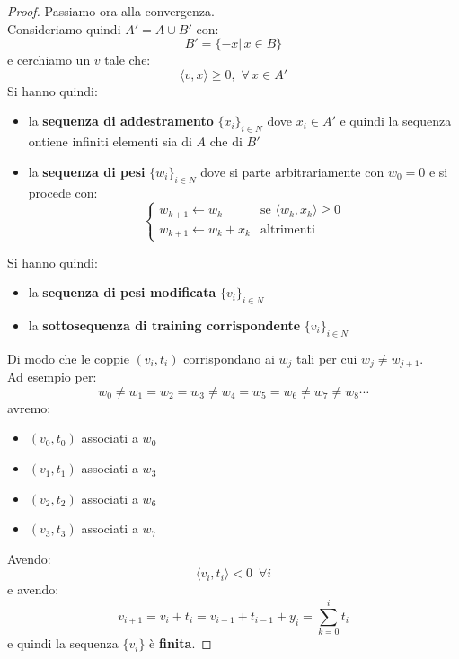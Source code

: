 		\begin{proof}
			Passiamo ora alla convergenza.\\
			Consideriamo quindi $A'=A\cup B'$ con:
			\[B'=\{-x|\, x\in B\}\]
			e cerchiamo un $v$ tale che:
			\[\langle v, x\rangle\geq 0,\,\,\forall\, x\in A'\]
			Si hanno quindi:
			\begin{itemize}
				\item la \textbf{sequenza di addestramento} $\{x_i\}_{i\in N}$ dove $x_i\in
				      A'$ e quindi la sequenza ontiene infiniti elementi sia di $A$ che di $B'$
				\item la \textbf{sequenza di pesi} $\{w_i\}_{i\in N}$ dove si parte
				      arbitrariamente con $w_0=0$ e si procede con:
				      \[
				      	\begin{cases}
				      		w_{k+1}\gets w_k     & \mbox{se }\langle w_k, x_k\rangle\geq 0 \\
				      		w_{k+1}\gets w_k+x_k & \mbox{altrimenti}                       
				      	\end{cases}
				      \]
			\end{itemize}
			Si hanno quindi:
			\begin{itemize}
				\item la \textbf{sequenza di pesi modificata} $\{v_i\}_{i\in N}$ 
				\item la \textbf{sottosequenza di training corrispondente} $\{v_i\}_{i\in N}$ 
			\end{itemize}
			Di modo che le coppie $(v_i, t_i)$ corrispondano ai $w_j$ tali per cui $w_j\neq
			w_{j+1}$.\\
			Ad esempio per:
			\[w_0\neq w_1=w_2=w_3\neq w_4=w_5=w_6\neq w_7\neq w_8\cdots\]
			avremo:
			\begin{itemize}
				\item $(v_0, t_0)$ associati a $w_0$
				\item $(v_1, t_1)$ associati a $w_3$
				\item $(v_2, t_2)$ associati a $w_6$
				\item $(v_3, t_3)$ associati a $w_7$
			\end{itemize}
			Avendo:
			\[\langle v_i, t_i\rangle<0\,\,\,\forall i\]
			e avendo:
			\[v_{i+1}=v_i+t_i=v_{i-1}+t_{i-1}+y_i=\sum_{k=0}^i t_i\]
			e quindi la sequenza $\{v_i\}$ è \textbf{finita}.
		\end{proof}
